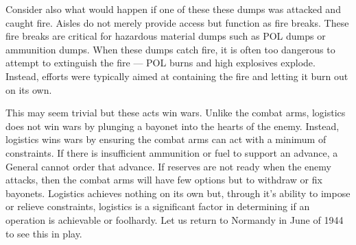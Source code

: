 \documentclass[noraggedright]{turabian-researchpaper}
\begin{document}
Consider also what would happen if one of these these dumps was attacked and
caught fire.  Aisles do not merely provide access but function as fire breaks.
These fire breaks are critical for hazardous material dumps such as POL dumps
or ammunition dumps.  When these dumps catch fire, it is often too dangerous
to attempt to extinguish the fire --- POL burns and high explosives explode.
Instead, efforts were typically aimed at containing the fire and letting it 
burn out on its own.  %

This may seem trivial but these acts win wars. Unlike the combat 
arms, logistics does not win wars by plunging a bayonet into the hearts of 
the enemy.   Instead, logistics wins wars by ensuring the combat arms can act 
with a minimum of constraints.  If there is insufficient ammunition or fuel 
to support an advance, a General cannot order that advance.  If reserves are 
not ready when the enemy attacks, then the combat arms will have few options 
but to withdraw or fix bayonets.  Logistics achieves nothing on its own but, 
through it's ability to impose or relieve constraints, logistics is a 
significant factor in determining if an operation is achievable or foolhardy.
Let us return to Normandy in June of 1944 to see this in play.





	


\end{document}
